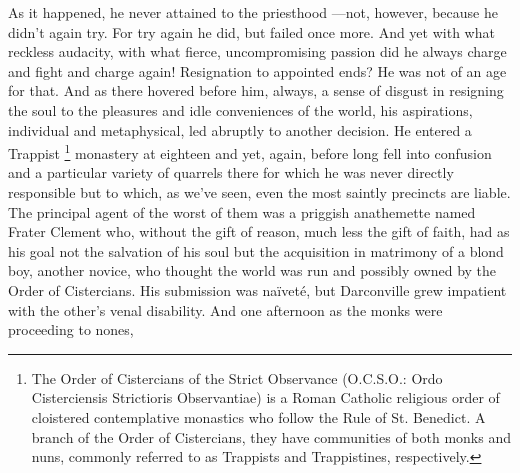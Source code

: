   As it happened, he never attained to the priesthood ---not, however, because he
didn't again try. For try again he did, but failed once more. And yet with what
reckless audacity, 
with what fierce, uncompromising passion did he always charge
and fight and charge again! Resignation to appointed ends? He was not of an age
for that. And as there hovered 
before him, always, a sense of disgust in
resigning the soul to the pleasures and idle conveniences of the world, his 
aspirations, 
individual and metaphysical, led abruptly to another decision. He
entered a Trappist 
\footnote{The Order of Cistercians of the Strict Observance (O.C.S.O.: 
Ordo Cisterciensis Strictioris Observantiae) is a Roman Catholic religious 
order of cloistered contemplative monastics who follow the Rule of 
St. Benedict. A branch of the Order of Cistercians, they have communities 
of both monks and nuns, commonly referred to as Trappists and Trappistines, 
respectively.
}
monastery at eighteen and yet, again, before long fell into
confusion and a particular variety of quarrels there for which he was never
directly responsible but to which, as we've seen, even the most saintly
precincts 
are liable. The principal agent of the worst of them was a priggish
anathemette 
named Frater Clement who, without the gift of reason, much less the
gift of faith, had as his goal not the salvation of his soul but the acquisition
in matrimony 
of a blond boy, another novice, who thought the world was run and
possibly owned by the Order of Cistercians. 
His submission was naïveté, but Darconville grew impatient with the other's venal 
disability. And one afternoon as the monks were proceeding to nones, 

